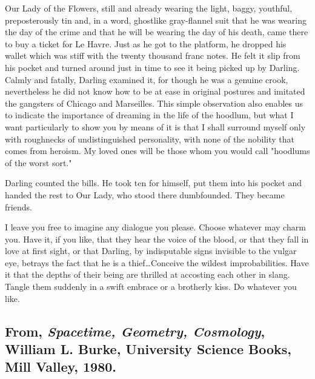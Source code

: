 \documentclass[
]{memoir}
\newlength{\drop}%
\begin{document}
Our Lady of the Flowers, still and already wearing the light, baggy,
youthful, preposterously tin and, in a word, ghostlike gray-flannel suit
that he was wearing the day of the crime and that he will be wearing the
day of his death, came there to buy a ticket for Le Havre. Just as he
got to the platform, he dropped his wallet which was stiff with the
twenty thousand franc notes. He felt it slip from his pocket and turned
around just in time to see it being picked up by Darling. Calmly and
fatally, Darling examined it, for though he was a genuine crook,
nevertheless he did not know how to be at ease in original postures and
imitated the gangsters of Chicago and Marseilles. This simple
observation also enables us to indicate the importance of dreaming in
the life of the hoodlum, but what I want particularly to show you by
means of it is that I shall surround myself only with roughnecks of
undistinguished personality, with none of the nobility that comes from
heroism. My loved ones will be those whom you would call "hoodlums of
the worst sort."

Darling counted the bills. He took ten for himself, put them into his
pocket and handed the rest to Our Lady, who stood there dumbfounded.
They became friends.

I leave you free to imagine any dialogue you please. Choose whatever may
charm you. Have it, if you like, that they hear the voice of the blood,
or that they fall in love at first sight, or that Darling, by
indisputable signs invisible to the vulgar eye, betrays the fact that he
is a thief\ldots{}Conceive the wildest improbabilities. Have it that the
depths of their being are thrilled at accosting each other in slang.
Tangle them suddenly in a swift embrace or a brotherly kiss. Do whatever
you like.

\hypertarget{from-spacetime-geometry-cosmology-william-l.-burke-university-science-books-mill-valley-1980.}{%
\subsection*{\texorpdfstring{From, \emph{Spacetime, Geometry,
Cosmology}, William L. Burke, University Science Books, Mill Valley,
1980.}{From, Spacetime, Geometry, Cosmology, William L. Burke, University Science Books, Mill Valley, 1980.}}\label{from-spacetime-geometry-cosmology-william-l.-burke-university-science-books-mill-valley-1980.}}
\end{document}
